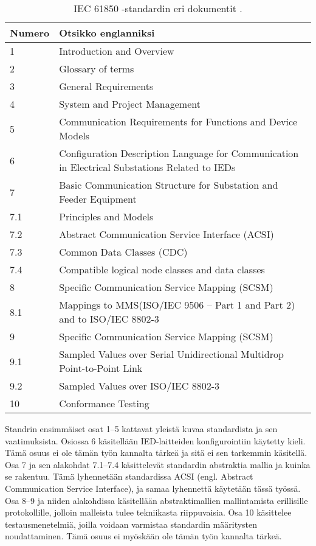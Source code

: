 \begin{table}[ht!]
	\caption{IEC 61850 -standardin eri dokumentit \cite[s.~2]{Mackiewicz2006}.}
	\label{tab:iec61850-dokumentin-osat}
	\begin{tabular}{l | l}
		\hline
		\textbf{Numero} & \textbf{Otsikko englanniksi} \\
		\hline \hline
		1 & Introduction and Overview \\
		2 & Glossary of terms \\
		3 & General Requirements \\
		4 & System and Project Management  \\
		5 & \parbox[t]{10cm}{Communication Requirements for Functions and Device Models} \\
		6 & \parbox[t]{10cm}{Configuration Description Language for Communication in Electrical Substations Related to IEDs} \\
		7 & \parbox[t]{10cm}{Basic Communication Structure for Substation and Feeder Equipment} \\
		7.1 & Principles and Models \\
		7.2 & Abstract Communication Service Interface (ACSI) \\
		7.3 & Common Data Classes (CDC) \\
		7.4 & Compatible logical node classes and data classes \\
		8 & Specific Communication Service Mapping (SCSM) \\
		8.1 & \parbox[t]{10cm}{Mappings to MMS(ISO/IEC 9506 – Part 1 and Part 2) and to ISO/IEC 8802-3} \\
		9 & Specific Communication Service Mapping (SCSM) \\
		9.1 & \parbox[t]{10cm}{Sampled Values over Serial Unidirectional Multidrop Point-to-Point Link} \\
		9.2 & Sampled Values over ISO/IEC 8802-3 \\
		10 & Conformance Testing \\
		\hline
	\end{tabular}
\end{table}

Standrin ensimmäiset osat 1--5 kattavat yleistä kuvaa standardista ja sen vaatimuksista. Osiossa 6 käsitellään IED-laitteiden konfigurointiin käytetty kieli. Tämä osuus ei ole tämän työn kannalta tärkeä ja sitä ei sen tarkemmin käsitellä. Osa 7 ja sen alakohdat 7.1--7.4 käsittelevät standardin abstraktia mallia ja kuinka se rakentuu. Tämä lyhennetään standardissa ACSI (engl. Abstract Communication Service Interface), ja samaa lyhennettä käytetään tässä työssä. Osa 8--9 ja niiden alakohdissa käsitellään abstraktimallien mallintamista erillisille protokollille, jolloin malleista tulee tekniikasta riippuvaisia. Osa 10 käsittelee testausmenetelmiä, joilla voidaan varmistaa standardin määritysten noudattaminen. Tämä osuus ei myöskään ole tämän työn kannalta tärkeä.

